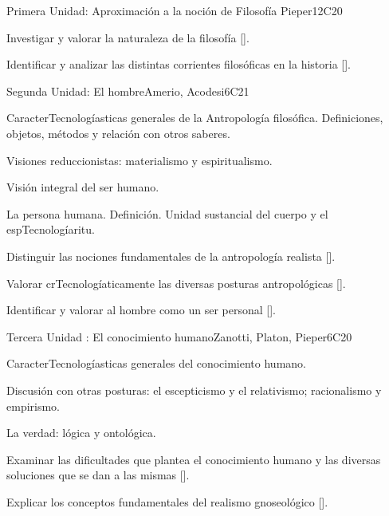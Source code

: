 \begin{syllabus}
\begin{unit}{}{Primera Unidad: Aproximación a la noción de Filosofía }{Pieper}{12}{C20}
\begin{learningoutcomes}
	\item Investigar y valorar la naturaleza de la filosofía [\Usage].
	\item Identificar y analizar las distintas corrientes filosóficas en la historia [\Usage].
\end{learningoutcomes}
\end{unit}

\begin{unit}{}{Segunda Unidad: El hombre}{Amerio, Acodesi}{6}{C21}
\begin{topics}
	\item CaracterTecnologíasticas generales de la Antropología filosófica. Definiciones, objetos, métodos y relación con otros saberes.
	\item Visiones reduccionistas: materialismo y espiritualismo.
	\item Visión integral del ser humano.
    \item La persona humana. Definición. Unidad sustancial del cuerpo y el espTecnologíaritu.
\end{topics}

\begin{learningoutcomes}
	\item Distinguir las nociones fundamentales de la antropología realista [\Usage].
	\item Valorar crTecnologíaticamente las diversas posturas antropológicas [\Usage].
	\item Identificar y valorar al hombre como un ser personal [\Usage].
\end{learningoutcomes}
\end{unit}

\begin{unit}{}{Tercera Unidad : El conocimiento humano}{Zanotti, Platon, Pieper}{6}{C20}
\begin{topics}
	\item CaracterTecnologíasticas generales del conocimiento humano.
    \item Discusión con otras posturas: el escepticismo y el relativismo; racionalismo y empirismo.
    \item La verdad: lógica y ontológica.
\end{topics}
\begin{learningoutcomes}
	\item Examinar las dificultades que plantea el conocimiento humano y las diversas soluciones que se dan a las mismas [\Usage].
    \item Explicar los conceptos fundamentales del realismo gnoseológico [\Usage].
\end{learningoutcomes}
\end{unit}


\end{syllabus}
